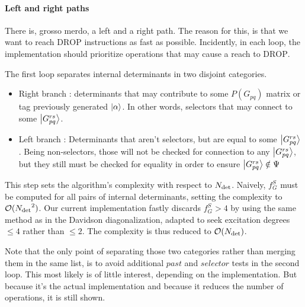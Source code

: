 \documentclass[./thesis.tex]{subfiles}
\newcommand{\Gpqrs}{\ket{G^{rs}_{pq}}}
\begin{document}
\paragraph{Left and right paths}
There is, grosso merdo, a left and a right path. The reason for this, is that we want to reach $\text{DROP}$ instructions as fast as possible. Incidently, in each loop, the implementation should prioritize operations that may cause a reach to $\text{DROP}$.


The first loop separates internal determinants in two disjoint categories.


\begin{itemize}
\item
Right branch : determinants that may contribute to some $P(G_{pq})$ matrix or tag previously generated $\ket \alpha$. In other words, selectors that may connect to some $\ket {G_{pq}^{rs}}$. 

\item
Left branch : Determinants that aren't selectors, but are equal to some $\ket {G_{pq}^{rs}}$. Being non-selectors, those will not be checked for connection to any $\ket {G_{pq}^{rs}}$, but they still must be checked for equality in order to ensure $\ket {G_{pq}^{rs}} \notin \Psi$
\end{itemize}
This step sets the algorithm's complexity with respect to ${N_\text{det}}$. Naively, $f_G^S$ must be computed for all pairs of internal determinants, setting the complexity to $\mathcal{O}({N_\text{det}}^2)$. Our current implementation fastly discards $f_G^S > 4$ by using the same method as in the Davidson diagonalization, adapted to seek excitation degrees $\leq 4$ rather than $\leq 2$. The complexity is thus reduced to $\mathcal{O}({N_\text{det}})$.

Note that the only point of separating those two categories rather than merging them in the same list, is to avoid additional $past$ and $selector$ tests in the second loop.
This most likely is of little interest, depending on the implementation.
But because it's the actual implementation and because it reduces the number of operations, it is still shown.
\end{document}
